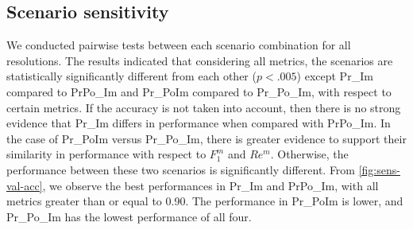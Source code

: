 \documentclass[Journal,letterpaper, SingleSpace, InsideFigs]{ascelike-new}
\begin{document}

\subsection{Scenario sensitivity}
We conducted pairwise tests between each scenario combination for all resolutions.
The results indicated that considering all metrics, the scenarios are statistically significantly different from each other ($p < .005$) except Pr\_Im compared to PrPo\_Im and Pr\_PoIm compared to Pr\_Po\_Im, with respect to certain metrics.
If the accuracy is not taken into account, then there is no strong evidence that Pr\_Im differs in performance when compared with PrPo\_Im.
In the case of Pr\_PoIm versus Pr\_Po\_Im, there is greater evidence to support their similarity in performance 
with respect to  $F_{1}^{m}$ and $Re^{m}$. %
Otherwise, the performance between these two scenarios is significantly different.
From \autoref{fig:sens-val-acc}, we observe the best performances in Pr\_Im and PrPo\_Im, with all metrics greater than or equal to 0.90.
The performance in Pr\_PoIm is lower, and Pr\_Po\_Im has the lowest performance of all four.
\end{document}
